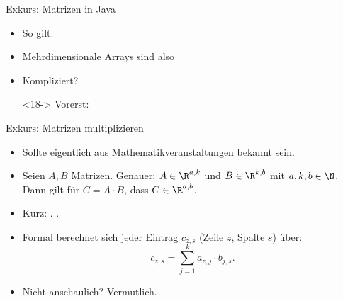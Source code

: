 \begin{frame}[t,fragile]{Exkurs: Matrizen in Java}
\begin{itemize}[<+(1)->]
\begin{center}
        \end{center}
        \item<12-> So gilt: 
        \item<14-> Mehrdimensionale Arrays sind also 
        \item<16-> Kompliziert? 
        \item[\color{cprimary}\tiny\raisebox{1.45pt}{$\blacksquare$}]<18-> Vorerst:   
    \end{itemize}
\end{frame}

\begin{frame}[t,fragile]{Exkurs: Matrizen multiplizieren}
    \begin{itemize}[<+(1)->]
        \item Sollte eigentlich aus Mathematikveranstaltungen bekannt sein.
        \item Seien \(A, B\) Matrizen.\pause{} Genauer: \(A \in \R^{a, k}\) und \(B \in \R^{k, b}\) mit \(a, k, b \in \N\).\pause{}
        Dann gilt für \(C = A \cdot B\), dass \(C \in \R^{a, b}\).
        \item Kurz:\pause{} .\pause{} .
        \item Formal berechnet sich jeder Eintrag \(c_{z,s}\) (Zeile \(z\), Spalte \(s\)) über:\pause \[c_{z,s} = \sum_{j = 1}^k a_{z,j} \cdot b_{j,s}.\]
        \item Nicht anschaulich? Vermutlich.
    \end{itemize}
\end{frame}

